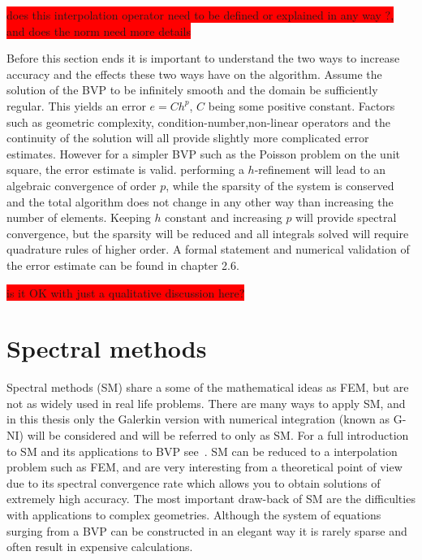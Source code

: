 \colorbox{red}{does this interpolation operator need to be defined or explained in any way ?, and does the norm need more details}

Before this section ends it is important to understand the two ways to increase accuracy and the effects these two ways have on the algorithm. 
Assume the solution of the BVP to be infinitely smooth and the domain be sufficiently regular. 
This yields an error $e = Ch^p$, $C$ being some positive constant.
Factors such as geometric complexity, condition-number,non-linear operators and the continuity of the 
solution will all provide slightly more complicated error estimates. 
However for a simpler BVP such as the Poisson problem on the unit square, the error estimate is valid.  
performing a $h$-refinement will lead to an algebraic convergence of order $p$, while the sparsity of the system is conserved
and the total algorithm does not change in any other way than increasing the number of elements.
Keeping $h$ constant and increasing $p$ will provide spectral convergence, but the sparsity will be reduced and all integrals solved will require 
quadrature rules of higher order. A formal statement and numerical validation of the error estimate can be found in \cite{Karniadakis} chapter 2.6.  

\colorbox{red}{is it OK with just a qualitative discussion here?}


\section{Spectral methods}
Spectral methods (SM) share a some of the mathematical ideas as FEM, but are not as widely used in real life problems. 
There are many ways to apply SM, 
and in this thesis only the Galerkin version with numerical integration (known as G-NI) will be considered and will be referred to only as SM. 
For a full introduction to SM and its applications to BVP see~\cite{Canuto}.
SM can be reduced to a interpolation problem such as FEM, and are very interesting from a theoretical point of view due to its 
spectral convergence rate which allows you to obtain solutions of extremely high accuracy. 
The most important draw-back of SM are the difficulties with applications to complex geometries. Although the system of equations surging from
a BVP can be constructed in an elegant way it is rarely sparse and often result in expensive calculations. 

